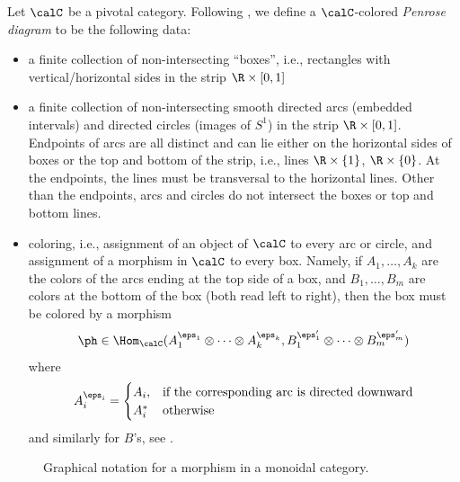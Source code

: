 Let $\calC$ be a pivotal category. Following \cite{turaev-virelizier}, we
define a $\calC$-colored \emph{Penrose diagram} to be the following data:
\begin{itemize}
  \item a finite collection of non-intersecting ``boxes'', i.e., rectangles
  with vertical/horizontal sides in the strip $\R\times [0,1]$
  \item a finite collection of non-intersecting smooth directed arcs (embedded
  intervals) and directed circles (images of $S^1$) in the strip $\R\times
  [0,1]$. Endpoints of arcs are all distinct and can lie
  either on the horizontal sides of boxes or the top and bottom of the strip,
  i.e., lines $\R\times\{1\}$, $\R\times \{0\}$. At the endpoints, the lines
  must be transversal to the horizontal lines. Other than the endpoints, arcs
  and circles do not intersect the boxes or top and bottom lines.
  \item coloring, i.e., assignment of an object of $\calC$ to every arc or
  circle, and assignment of a morphism in $\calC$ to every box. Namely, if
  $A_1, \dots, A_k$ are the colors of the arcs ending at the top side of a box,
  and $B_1, \dots, B_m$ are colors at the bottom of the box (both read left to
  right), then the box must be colored by a morphism
  $$
    \ph\in \Hom_\calC(
      A_1^{\eps_1}\otimes\dots\otimes A_k^{\eps_k},
      B_1^{\eps'_1}\otimes\dots\otimes B_m^{\eps'_m}
    )
  $$
  where
  \begin{equation}\label{e:signed-object}
    A_i^{\eps_i} =\begin{cases}
                 A_i, & \text{if the corresponding arc is directed downward}\\
                 A_i^* &\text{otherwise}
                 \end{cases}
  \end{equation}
  and similarly for $B$'s, see .
\end{itemize}
\begin{figure}[h]
  \centering
  \caption{Graphical notation for a morphism in a monoidal category.}
  \label{f:graphical-morphism2}
\end{figure}

